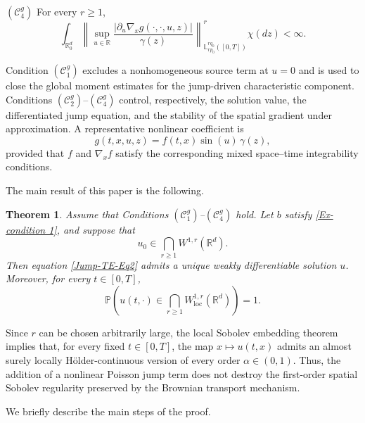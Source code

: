 \documentclass[12pt,oneside, reqno]{amsart}
\newtheorem{theorem}{Theorem}[section]
\def\mL{{\mathbb L}}
\def\geq{\geqslant}
\numberwithin{equation}{section}
\begin{document}
	\noindent
	\((\mathcal C_4^g)\) For every \(r\geq1\),
	\begin{equation*}
		\int_{\mathbb{R}_0^d}
		\left\|
		\sup_{u\in\mathbb{R}}
		\frac{
			|\partial_u\nabla_xg(\cdot,\cdot,u,z)|
		}{
			\gamma(z)
		}
		\right\|_{\mL_{rp_0}^{rq_0}([0,T])}^{r}
		\chi(dz)
		<\infty.
	\end{equation*}
	
	Condition \((\mathcal C_1^g)\) excludes a nonhomogeneous source term at	\(u=0\) and is used to close the global moment estimates for the	jump-driven characteristic component. Conditions \((\mathcal C_2^g)\)--\((\mathcal C_4^g)\) control, respectively, the	solution value, the differentiated jump equation, and the stability of	the spatial gradient under approximation. A representative nonlinear	coefficient is
	\begin{equation*}
		g(t,x,u,z)
		=
		f(t,x)\sin(u)\,\gamma(z),
	\end{equation*}
	provided that \(f\) and \(\nabla_xf\) satisfy the corresponding mixed	space--time integrability conditions.
	
	The main result of this paper is the following.
	
	\begin{theorem}\label{mainresult1}
		Assume that Conditions	\((\mathcal C_1^g)\)--\((\mathcal C_4^g)\) hold. Let \(b\) satisfy	\eqref{Ex-condition 1}, and suppose that
		\begin{equation*}
			u_0\in\bigcap_{r\geq1}W^{1,r}(\mathbb{R}^d).
		\end{equation*}
		Then equation \eqref{Jump-TE-Eq2} admits a unique weakly	differentiable solution \(u\). Moreover, for every \(t\in[0,T]\),
		\begin{equation*}
			\mathbb{P}\left(
			u(t,\cdot)
			\in
			\bigcap_{r\geq1}W_{\mathrm{loc}}^{1,r}(\mathbb{R}^d)
			\right)
			=1.
		\end{equation*}
	\end{theorem}
	
	Since \(r\) can be chosen arbitrarily large, the local Sobolev embedding	theorem implies that, for every fixed \(t\in[0,T]\), the map \(x\mapsto u(t,x)\) admits an almost surely locally	H\"older-continuous version of every order \(\alpha\in(0,1)\). Thus,	the addition of a nonlinear Poisson jump term does not destroy the	first-order spatial Sobolev regularity preserved by the Brownian	transport mechanism.
	
	We briefly describe the main steps of the proof.
	
\end{document}
